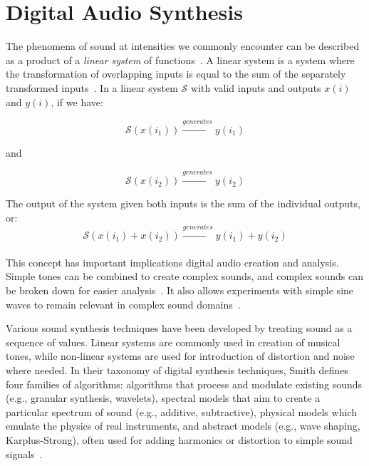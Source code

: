 \documentclass[\main/thesis.tex]{subfiles}
\begin{document}


\section{Digital Audio Synthesis}
\label{sec_digital_synthesis}
The phenomena of sound at intensities we commonly encounter can be described as a product of a \textit{linear system} of functions~\cite{cook1999chap4}. A linear system is a system where the transformation of overlapping inputs is equal to the sum of the separately transformed inputs~\cite{lyons2004understandingChap1,cook1999chap4}. In a linear system $\mathcal{S}$ with valid inputs and outputs $x(i)$ and $y(i)$, if we have:

\begin{equation}
 \mathcal{S}(x(i_1)) \xrightarrow{generates} y(i_1)
\end{equation}
\begin{center}
    and
\end{center}
\begin{equation}
\mathcal{S}(x(i_2)) \xrightarrow{generates}y(i_2)
\end{equation}

The output of the system given both inputs is the sum of the individual outputs, or:
\begin{equation}
 \mathcal{S}(x(i_1)+x(i_2)) \xrightarrow{generates} y(i_1)+y(i_2) 
\end{equation}
\\
This concept has important implications digital audio creation and analysis. Simple tones can be combined to create complex sounds, and complex sounds can be broken down for easier analysis~\cite{lyons2004understandingChap1}. It also allows experiments with simple sine waves to remain relevant in complex sound domains~\cite{cook1999chap4}.


Various sound synthesis techniques have been developed by treating sound as a sequence of values. Linear systems are commonly used in creation of musical tones, while non-linear systems are used for introduction of distortion and noise where needed. In their taxonomy of digital synthesis techniques, Smith defines four families of algorithms: algorithms that process and modulate existing sounds (e.g., granular synthesis, wavelets), spectral models that aim to create a particular spectrum of sound (e.g., additive, subtractive), physical models which emulate the physics of real instruments, and abstract models (e.g., wave shaping, Karplus-Strong), often used for adding harmonics or distortion to simple sound signals~\cite{smith1991viewpoints}. 
\end{document}
